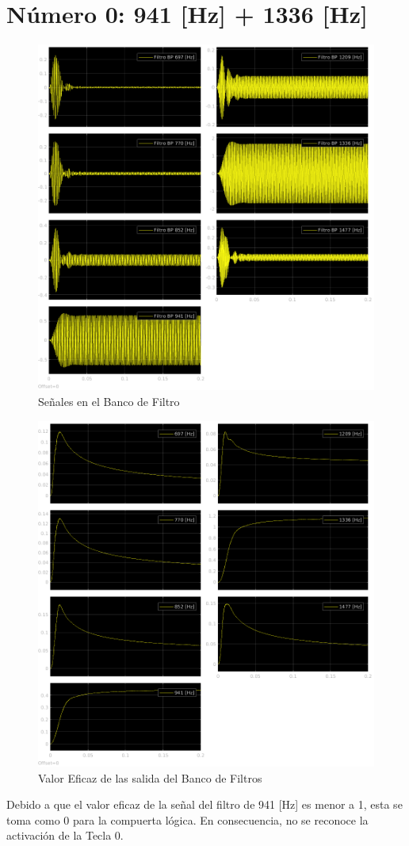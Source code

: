 \section{Número 0: 941 [Hz] + 1336 [Hz]}
\label{sec:signal_0}
\begin{figure}[H]
  \centering
  \includegraphics[width=\linewidth]{images/simulacion/fallas/bank/0.png}
  \caption{Señales en el Banco de Filtro}
  \label{fig:num_0_bank}
\end{figure}

\begin{figure}[H]
  \centering
  \includegraphics[width=\linewidth]{images/simulacion/fallas/rms/0.png}
  \caption{Valor Eficaz de las salida del Banco de Filtros }
  \label{fig:num_0_rms}
\end{figure}

Debido a que el valor eficaz de la señal del filtro de 941 [Hz] es menor a 1, esta se toma como 0 para la compuerta lógica. En consecuencia, no se reconoce la activación de la Tecla 0.

